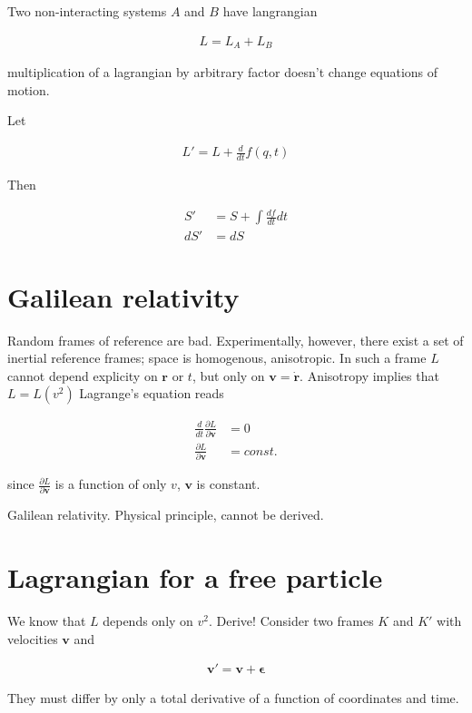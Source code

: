 \documentclass{article}
\newcommand{\mb}{\mathbf}
\begin{document}
Two non-interacting systems $A$ and $B$ have langrangian

\begin{align}
L = L_A + L_B 
\end{align}

multiplication of a lagrangian by arbitrary factor doesn't change equations of motion.

Let

\begin{align}
L' = L + \frac{d}{dt} f(q,t)
\end{align}

Then

\begin{align}
S' &= S + \int \frac{df}{dt} dt \\
dS' &= dS
\end{align}

\section{Galilean relativity}

Random frames of reference are bad. Experimentally, however, there exist a set of inertial reference frames; space is homogenous, anisotropic. In such a frame $L$ cannot depend explicity on $\mb{r}$ or $t$, but only on $\mb{v} = \dot{\mb{r}}$. Anisotropy implies that $L = L(v^2)$ Lagrange's equation reads

\begin{align}
\frac{d}{dt} \frac{\partial L}{\partial \mb{v}} &= 0 \\
\frac{\partial L}{\partial \mb{v}} &= const.
\end{align}

since $\frac{\partial L}{\partial \mb{v}}$ is a function of only $v$, $\mb{v}$ is constant.

Galilean relativity. Physical principle, cannot be derived.

\section{Lagrangian for a free particle}

We know that $L$ depends only on $v^2$. Derive! Consider two frames $K$ and $K'$ with velocities $\mb{v}$ and 

\begin{align}
\mb{v'} = \mb{v} + \mb{\epsilon}
\end{align}

They must differ by only a total derivative of a function of coordinates and time.
\end{document}
